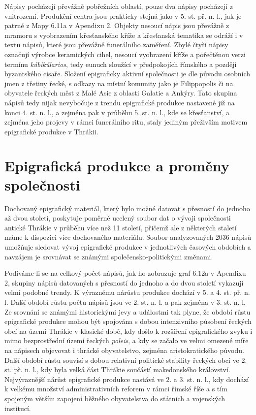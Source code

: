 \NC\AR
\HL
\HL
\stoptable

Nápisy pocházejí převážně pobřežních oblastí, pouze dva nápisy pocházejí z vnitrozemí. Produkční centra jsou prakticky stejná jako v 5. st. př. n. l., jak je patrné z Mapy 6.11a v Apendixu 2. Objekty nesoucí nápis jsou převážně z mramoru s vyobrazením křesťanského kříže a křesťanská tematika se odráží i v textu nápisů, které jsou převážně funerálního zaměření. Zbylé čtyři nápisy označují výrobce keramických cihel, nesoucí vyobrazení kříže a pořečtěnou verzi termínu {\em kúbikúlarios}, tedy eunuch sloužící v předpokojích římského a později byzantského císaře. Složení epigraficky aktivní společnosti je dle původu osobních jmen z třetiny řecké, s odkazy na místní komunity jako je Filippopolis či na obyvatele řeckých měst z Malé Asie z oblasti Galatie a Ankýry. Tato skupina nápisů tedy nijak nevybočuje z trendu epigrafické produkce nastavené již na konci 4. st. n. l., a zejména pak v průběhu 5. st. n. l., kde se křesťanství, a zejména jeho projevy v rámci funerálního ritu, staly jediným přeživším motivem epigrafické produkce v Thrákii.

\section[epigrafická-produkce-a-proměny-společnosti]{Epigrafická produkce a proměny společnosti}

Dochovaný epigrafický materiál, který bylo možné datovat s přesností do jednoho až dvou století, poskytuje poměrně ucelený soubor dat o vývoji společnosti antické Thrákie v průběhu více než 11 století, přičemž ale z některých staletí máme k dispozici více dochovaného materiálu. Soubor analyzovaných 2036 nápisů umožňuje sledovat vývoj epigrafické produkce v jednotlivých časových obdobích a navzájem je srovnávat se známými společensko-politickými změnami.

Podíváme-li se na celkový počet nápisů, jak ho zobrazuje graf 6.12a v Apendixu 2, skupiny nápisů datovaných s přesností do jednoho a do dvou století vykazují velmi podobné trendy. K výraznému nárůstu produkce dochází v 5. a 4. st. př. n. l. Další období růstu počtu nápisů jsou ve 2. st. n. l. a pak zejména v 3. st. n. l. Ze srovnání se známými historickými jevy a událostmi tak plyne, že období růstu epigrafické produkce mohou být spojována s dobou intenzivního působení řeckých obcí na území Thrákie v klasické době, kdy došlo k rozšíření epigrafického zvyku i mimo bezprostřední území řeckých {\em poleis}, a kdy se začalo ve velmi omezené míře na nápisech objevovat i thrácké obyvatelstvo, zejména aristokratického původu. Další období růstu souvisí s dobou relativní politické stability řeckých obcí ve 2. st. př. n. l., kdy byla velká část Thrákie součástí makedonského království. Nejvýraznější nárůst epigrafické produkce nastává ve 2. a 3. st. n. l., kdy dochází k velkému množství administrativních reforem v rámci římské říše a s tím spojeným větším zapojení běžného obyvatelstva do státních a vojenských institucí.

